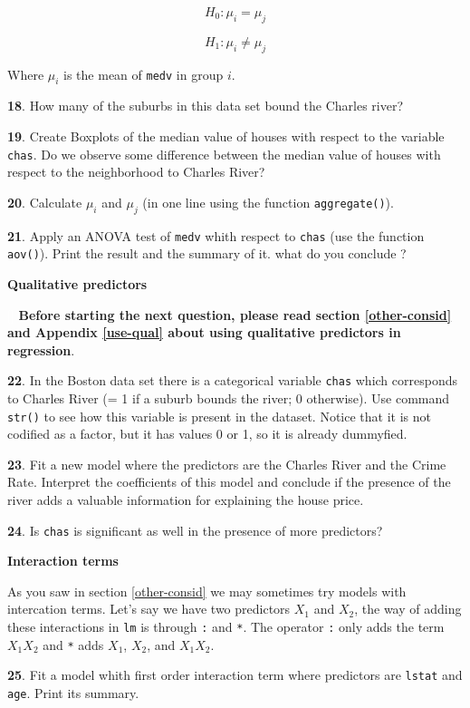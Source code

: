 \documentclass[]{book}
\theoremstyle{definition}
\theoremstyle{definition}
\theoremstyle{definition}
\theoremstyle{remark}
\begin{document}
\[ H_0 : \mu_i = \mu_j \]

\[ H_1 : \mu_i \neq \mu_j \]

Where \(\mu_i\) is the mean of \texttt{medv} in group \(i\).

\textbf{18}. How many of the suburbs in this data set bound the Charles
river?

\textbf{19}. Create Boxplots of the median value of houses with respect
to the variable \texttt{chas}. Do we observe some difference between the
median value of houses with respect to the neighborhood to Charles
River?

\textbf{20}. Calculate \(\mu_i\) and \(\mu_j\) (in one line using the
function \texttt{aggregate()}).

\textbf{21}. Apply an ANOVA test of \texttt{medv} whith respect to
\texttt{chas} (use the function \texttt{aov()}). Print the result and
the summary of it. what do you conclude ?

\textbf{Qualitative predictors}

\textcolor{white}{[}\faExclamationTriangle\textcolor{white}{]}
\textbf{Before starting the next question, please read section
\ref{other-consid} and Appendix \ref{use-qual} about using qualitative
predictors in regression}.

\textbf{22}. In the Boston data set there is a categorical variable
\texttt{chas} which corresponds to Charles River (= 1 if a suburb bounds
the river; 0 otherwise). Use command \texttt{str()} to see how this
variable is present in the dataset. Notice that it is not codified as a
factor, but it has values 0 or 1, so it is already dummyfied.

\textbf{23}. Fit a new model where the predictors are the Charles River
and the Crime Rate. Interpret the coefficients of this model and
conclude if the presence of the river adds a valuable information for
explaining the house price.

\textbf{24}. Is \texttt{chas} is significant as well in the presence of
more predictors?

\textbf{Interaction terms}

As you saw in section \ref{other-consid} we may sometimes try models
with intercation terms. Let's say we have two predictors \(X_1\) and
\(X_2\), the way of adding these interactions in \texttt{lm} is through
\texttt{:} and \texttt{*}. The operator \texttt{:} only adds the term
\(X_1X_2\) and \texttt{*} adds \(X_1\), \(X_2\), and \(X_1X_2\).

\textbf{25}. Fit a model whith first order interaction term where
predictors are \texttt{lstat} and \texttt{age}. Print its summary.
\end{document}
